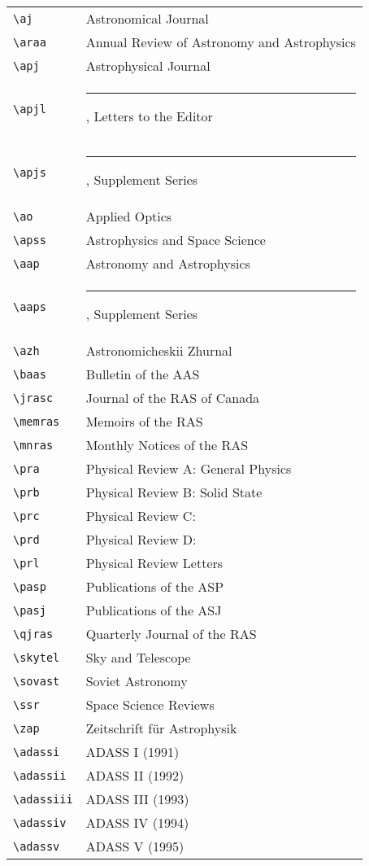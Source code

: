 \documentclass[11pt,twoside]{article}
\begin{document}
\begin{center}
\begin{tabular}{ll}
\verb+\aj+ & Astronomical Journal\\
\verb+\araa+ & Annual Review of Astronomy and Astrophysics\\
\verb+\apj+ & Astrophysical Journal\\
\verb+\apjl+ & \rule[.5ex]{2em}{.4pt}, Letters to the Editor\\
\verb+\apjs+ & \rule[.5ex]{2em}{.4pt}, Supplement Series\\
\verb+\ao+ & Applied Optics\\
\verb+\apss+ & Astrophysics and Space Science\\
\verb+\aap+ & Astronomy and Astrophysics\\
\verb+\aaps+ & \rule[.5ex]{2em}{.4pt}, Supplement Series\\
\verb+\azh+ & Astronomicheskii Zhurnal\\
\verb+\baas+ & Bulletin of the AAS\\
\verb+\jrasc+ & Journal of the RAS of Canada\\
\verb+\memras+ & Memoirs of the RAS\\
\verb+\mnras+ & Monthly Notices of the RAS\\
\verb+\pra+ & Physical Review A: General Physics\\
\verb+\prb+ & Physical Review B: Solid State\\
\verb+\prc+ & Physical Review C:\\
\verb+\prd+ & Physical Review D:\\
\verb+\prl+ & Physical Review Letters\\
\verb+\pasp+ & Publications of the ASP\\
\verb+\pasj+ & Publications of the ASJ\\
\verb+\qjras+ & Quarterly Journal of the RAS\\
\verb+\skytel+ & Sky and Telescope\\
\verb+\sovast+ & Soviet Astronomy\\
\verb+\ssr+ & Space Science Reviews\\
\verb+\zap+ & Zeitschrift f\"ur Astrophysik\\
\verb+\adassi+ & ADASS I (1991)\\
\verb+\adassii+ & ADASS II (1992)\\
\verb+\adassiii+ & ADASS III (1993)\\
\verb+\adassiv+ & ADASS IV (1994)\\
\verb+\adassv+ & ADASS V (1995)\\

\end{tabular}
\end{center}
\end{document}

